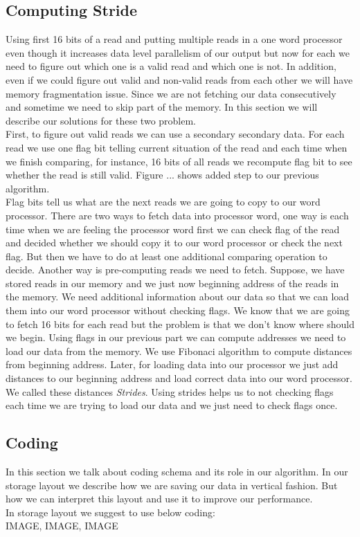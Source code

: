 \subsection{Computing Stride} \label{stride}
Using first 16 bits of a read and putting multiple reads in a one word processor even though it increases data level parallelism of our output but now for each we need to figure out which one is a valid read and which one is not. In addition, even if we could figure out valid and non-valid reads from each other we will have memory fragmentation issue. Since we are not fetching our data consecutively and sometime we need to skip part of the memory. In this section we will describe our solutions for these two problem.\\
First, to figure out valid reads we can use a secondary secondary data. For each read we use one flag bit telling current situation of the read and each time when we finish comparing, for instance, 16 bits of all reads we recompute flag bit to see whether the read is still valid. Figure ... shows added step to our previous algorithm.\\

Flag bits tell us what are the next reads we are going to copy to our word processor. There are two ways to fetch data into processor word, one way is each time when we are feeling the processor word first we can check flag of the read and decided whether we should copy it to our word processor or check the next flag. But then we have to do at least one additional comparing operation to decide. Another way is pre-computing reads we need to fetch. Suppose, we have stored reads in our memory and we just now beginning address of the reads in the memory. We need additional information about our data so that we can load them into our word processor without checking flags. We know that we are going to fetch 16 bits for each read but the problem is that we don't know where should we begin. Using flags in our previous part we can compute addresses we need to load our data from the memory. We use Fibonaci algorithm to compute distances from beginning address. Later, for loading data into our processor we just add distances to our beginning address and load correct data into our word processor. We called these distances \emph{Strides}. Using strides helps us to not checking flags each time we are trying to load our data and we just need to check flags once.

\subsection{Coding}
In this section we talk about coding schema and its role in our algorithm. In our storage layout we describe how we are saving our data in vertical fashion. But how we can interpret this layout and use it to improve our performance.\\
In storage layout we suggest to use below coding:\\
 IMAGE, IMAGE, IMAGE
 
